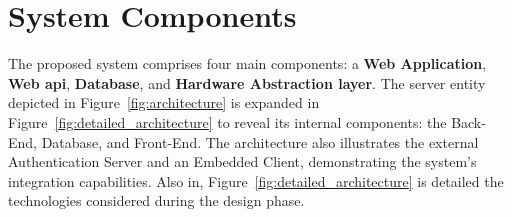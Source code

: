 \section{System Components}\label{sec:system_components} 
The proposed system comprises four main components: a \textbf{Web Application}, \textbf{Web \acs{api}}, \textbf{Database}, and \textbf{Hardware Abstraction layer}. The server entity depicted in Figure~\ref{fig:architecture} is expanded in Figure~\ref{fig:detailed_architecture} to reveal its internal components: the Back-End, Database, and Front-End. The architecture also illustrates the external Authentication Server and an Embedded Client, demonstrating the system's integration capabilities. Also in, Figure~\ref{fig:detailed_architecture} is detailed the technologies considered during the design phase.

